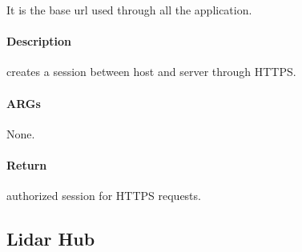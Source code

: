 \documentclass[letterpaper,10pt,english]{sphinxmanual}
\begin{document}
\begin{fulllineitems}
\label{\detokenize{gemini_login:gemini_login.URL}}
\pysigstartsignatures
{}
\pysigstopsignatures
\sphinxAtStartPar
It is the base url used through all the application.

\end{fulllineitems}


\begin{fulllineitems}
\label{\detokenize{gemini_login:gemini_login.login_ouster}}
\pysigstartsignatures
{}
\pysigstopsignatures

\paragraph{Description}
\label{\detokenize{gemini_login:id1}}
\sphinxAtStartPar
creates a session between host and server through HTTPS.


\paragraph{ARGs}
\label{\detokenize{gemini_login:args}}
\sphinxAtStartPar
None.


\paragraph{Return}
\label{\detokenize{gemini_login:return}}\begin{description}
\sphinxAtStartPar
authorized session for HTTPS requests.

\end{description}

\end{fulllineitems}


\sphinxstepscope


\subsection{Lidar Hub}
\label{\detokenize{gemini_lidar_hub_API:lidar-hub}}\label{\detokenize{gemini_lidar_hub_API::doc}}
\end{document}
